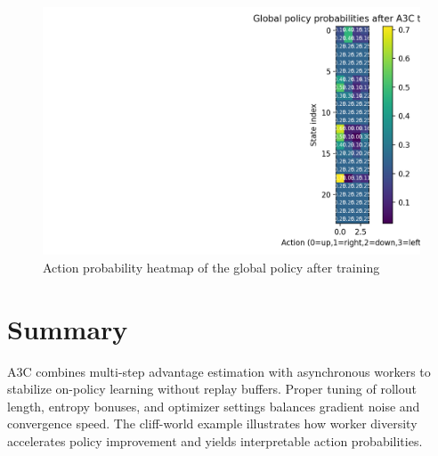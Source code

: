 ﻿\documentclass[12pt]{article}
\begin{document}
\begin{figure}[H]
  \centering
  \includegraphics[width=0.82\linewidth]{a3c_policy_heatmap.png}
  \caption{Action probability heatmap of the global policy after training}
  \label{fig:a3c_policy_heatmap}
\end{figure}

\FloatBarrier
\section{Summary}
A3C combines multi-step advantage estimation with asynchronous workers to stabilize on-policy learning without replay buffers. Proper tuning of rollout length, entropy bonuses, and optimizer settings balances gradient noise and convergence speed. The cliff-world example illustrates how worker diversity accelerates policy improvement and yields interpretable action probabilities.
\end{document}
